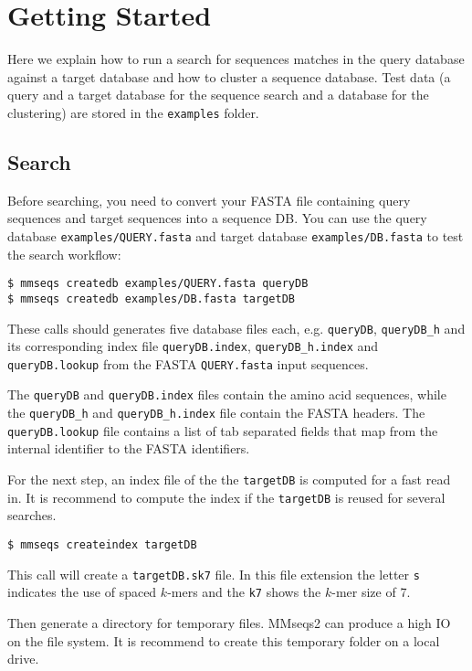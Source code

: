 \documentclass[11pt,a4paper]{scrreprt}
\begin{document}
\section{Getting Started}
Here we explain how to run a search for sequences matches in the query database against a target database and how to cluster a sequence database. Test data (a query and a target database for the sequence search and a database for the clustering) are stored in the \texttt{examples} folder.
\subsection*{Search}
Before searching, you need to convert your FASTA file containing query sequences and target sequences into a sequence DB. You can use the query database \texttt{examples/QUERY.fasta} and target database \texttt{examples/DB.fasta} to test the search workflow:


\begin{verbatim}
$ mmseqs createdb examples/QUERY.fasta queryDB
$ mmseqs createdb examples/DB.fasta targetDB
\end{verbatim}
 
These calls should generates five database files each, e.g. \texttt{queryDB}, \texttt{queryDB\_h} and its corresponding index file \texttt{queryDB.index}, \texttt{queryDB\_h.index} and \texttt{queryDB.lookup} from the FASTA \texttt{QUERY.fasta} input sequences.


The \texttt{queryDB} and \texttt{queryDB.index} files contain the amino acid sequences, while the \texttt{queryDB\_h} and \texttt{queryDB\_h.index} file contain the FASTA headers. The \texttt{queryDB.lookup} file contains a list of tab separated fields that map from the internal identifier to the FASTA identifiers.


For the next step, an index file of the the \texttt{targetDB} is computed for a fast read in. It is recommend to compute the index if the \texttt{targetDB} is reused for several searches.


\begin{verbatim}
$ mmseqs createindex targetDB
\end{verbatim}


This call will create a \texttt{targetDB.sk7} file. In this file extension the letter \texttt{s} indicates the use of spaced $k$-mers and the \texttt{k7} shows the $k$-mer size of 7.


Then generate a directory for temporary files. MMseqs2 can produce a high IO on the file system. It is recommend to create this temporary folder on a local drive.
\end{document}
